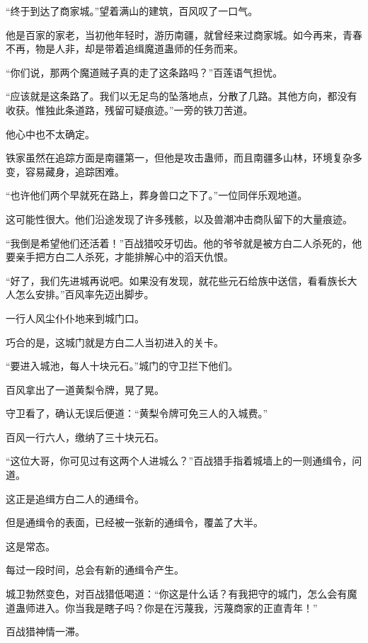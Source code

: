 
\begin{this_body}

“终于到达了商家城。”望着满山的建筑，百风叹了一口气。

他是百家的家老，当初他年轻时，游历南疆，就曾经来过商家城。如今再来，青春不再，物是人非，却是带着追缉魔道蛊师的任务而来。

“你们说，那两个魔道贼子真的走了这条路吗？”百莲语气担忧。

“应该就是这条路了。我们以无足鸟的坠落地点，分散了几路。其他方向，都没有收获。惟独此条道路，残留可疑痕迹。”一旁的铁刀苦道。

他心中也不太确定。

铁家虽然在追踪方面是南疆第一，但他是攻击蛊师，而且南疆多山林，环境复杂多变，容易藏身，追踪困难。

“也许他们两个早就死在路上，葬身兽口之下了。”一位同伴乐观地道。

这可能性很大。他们沿途发现了许多残骸，以及兽潮冲击商队留下的大量痕迹。

“我倒是希望他们还活着！”百战猎咬牙切齿。他的爷爷就是被方白二人杀死的，他要亲手把方白二人杀死，才能排解心中的滔天仇恨。

“好了，我们先进城再说吧。如果没有发现，就花些元石给族中送信，看看族长大人怎么安排。”百风率先迈出脚步。

一行人风尘仆仆地来到城门口。

巧合的是，这城门就是方白二人当初进入的关卡。

“要进入城池，每人十块元石。”城门的守卫拦下他们。

百风拿出了一道黄梨令牌，晃了晃。

守卫看了，确认无误后便道：“黄梨令牌可免三人的入城费。”

百风一行六人，缴纳了三十块元石。

“这位大哥，你可见过有这两个人进城么？”百战猎手指着城墙上的一则通缉令，问道。

这正是追缉方白二人的通缉令。

但是通缉令的表面，已经被一张新的通缉令，覆盖了大半。

这是常态。

每过一段时间，总会有新的通缉令产生。

城卫勃然变色，对百战猎低喝道：“你这是什么话？有我把守的城门，怎么会有魔道蛊师进入。你当我是瞎子吗？你是在污蔑我，污蔑商家的正直青年！”

百战猎神情一滞。


\end{this_body}
